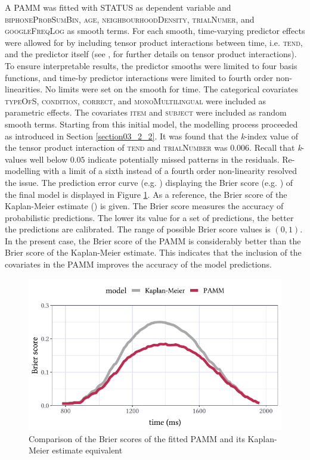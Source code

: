A PAMM was fitted with STATUS as dependent variable and \textsc{biphoneProbSumBin}, \textsc{age}, \textsc{neighbourhoodDensity}, \textsc{trialNumer}, and \textsc{googleFreqLog} as smooth terms. For each smooth, time-varying predictor effects were allowed for by including tensor product interactions between time, i.e. \textsc{tend}, and the predictor itself (see \cite{Wood2017}, for further details on tensor product interactions). To ensure interpretable results, the predictor smooths were limited to four basis functions, and time-by predictor interactions were limited to fourth order non-linearities. No limits were set on the smooth for time. The categorical covariates \textsc{typeOfS}, \textsc{condition}, \textsc{correct}, and \textsc{monoMultilingual} were included as parametric effects. The covariates \textsc{item} and \textsc{subject} were included as random smooth terms. Starting from this initial model, the modelling process proceeded as introduced in Section \ref{section03_2_2}. It was found that the \textit{k}-index value of the tensor product interaction of \textsc{tend} and \textsc{trialNumber} was $0.006$. Recall that \textit{k}-values well below $0.05$ indicate potentially missed patterns in the residuals. Re-modelling with a limit of a sixth instead of a fourth order non-linearity resolved the issue. The prediction error curve (e.g. \cite{Mogensen2012}) displaying the Brier score (e.g. \cite{Brier1950, Gerds2006, Bradley2008}) of the final model is displayed in Figure \ref{fig:7_2}. As a reference, the Brier score of the Kaplan-Meier estimate (\cite{Kaplan1958}) is given. The Brier score measures the accuracy of probabilistic predictions. The lower its value for a set of predictions, the better the predictions are calibrated. The range of possible Brier score values is $(0,1)$. In the present case, the Brier score of the PAMM is considerably better than the Brier score of the Kaplan-Meier estimate. This indicates that the inclusion of the covariates in the PAMM improves the accuracy of the model predictions. 

\begin{figure}
    \centering
    \includegraphics[]{figures/fig7.2.pdf}
    \caption{Comparison of the Brier scores of the fitted PAMM and its Kaplan-Meier estimate equivalent}
    \label{fig:7_2}
\end{figure}

